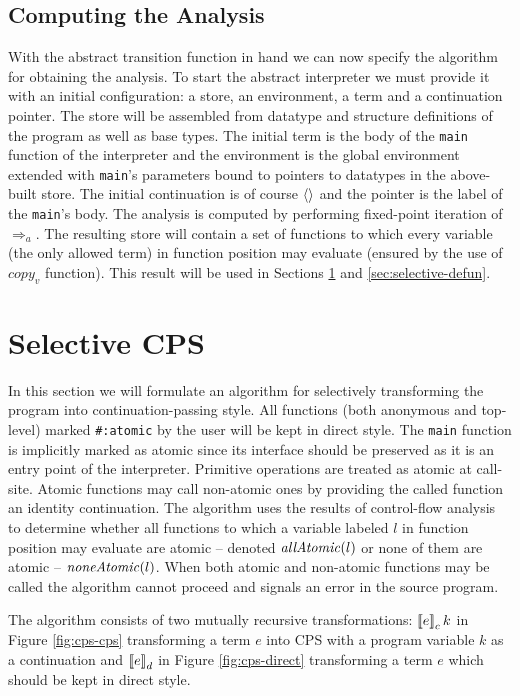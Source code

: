\subsection*{Computing the Analysis}
With the abstract transition function in hand we can now specify the algorithm for obtaining the analysis.
To start the abstract interpreter we must provide it with an initial configuration: a store, an environment, a term and a continuation pointer.
The store will be assembled from datatype and structure definitions of the program as well as base types.
The initial term is the body of the \lstinline!main! function of the interpreter and the environment is the global environment extended with \lstinline!main!'s parameters bound to pointers to datatypes in the above-built store.
The initial continuation is of course $\left<  \right>$ and the pointer is the label of the \lstinline!main!'s body.
The analysis is computed by performing fixed-point iteration of $\Rightarrow_a$.
The resulting store will contain a set of functions to which every variable (the only allowed term) in function position may evaluate (ensured by the use of $\mathit{copy}_v$ function).
This result will be used in Sections \ref{sec:selective-cps} and \ref{sec:selective-defun}.

\section{Selective CPS}\label{sec:selective-cps}
In this section we will formulate an algorithm for selectively transforming the program into continuation-passing style.
All functions (both anonymous and top-level) marked \lstinline!#:atomic! by the user will be kept in direct style.
The \lstinline!main! function is implicitly marked as atomic since its interface should be preserved as it is an entry point of the interpreter.
Primitive operations are treated as atomic at call-site.
Atomic functions may call non-atomic ones by providing the called function an identity continuation.
The algorithm uses the results of control-flow analysis to determine whether all functions to which a variable labeled $l$ in function position may evaluate are atomic -- denoted $\mathit{allAtomic}(l)$ or none of them are atomic -- $\mathit{noneAtomic}(l)$.
When both atomic and non-atomic functions may be called the algorithm cannot proceed and signals an error in the source program.

The algorithm consists of two mutually recursive transformations: $\left\llbracket e \right\rrbracket_c k$ in Figure \ref{fig:cps-cps} transforming a term $e$ into CPS with a program variable $k$ as a continuation and $\left\llbracket e \right\rrbracket_d$ in Figure \ref{fig:cps-direct} transforming a term $e$ which should be kept in direct style.

